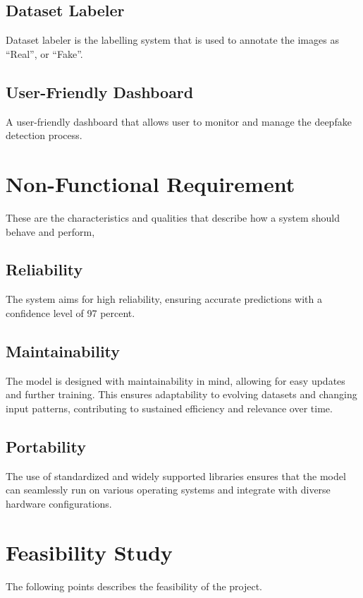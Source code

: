             \subsection{Dataset Labeler}
                Dataset labeler is the labelling system that is used to annotate the images as “Real”, or “Fake”.

            \subsection{User-Friendly Dashboard}
                A user-friendly dashboard that allows user to monitor and manage the deepfake detection process.

        \section{Non-Functional Requirement}
            These are the characteristics and qualities that describe how a system should behave and perform,

            \subsection{Reliability}
                The system aims for high reliability, ensuring accurate predictions with a confidence level of 97 percent.
            \subsection{Maintainability}
                The model is designed with maintainability in mind, allowing for easy updates and further training. This ensures adaptability to evolving datasets and changing input patterns, contributing to sustained efficiency and relevance over time.
            \subsection{Portability}
                The use of standardized and widely supported libraries ensures that the model can seamlessly run on various operating systems and integrate with diverse hardware configurations.
            
        \section{Feasibility Study}
            The following points describes the feasibility of the project.

